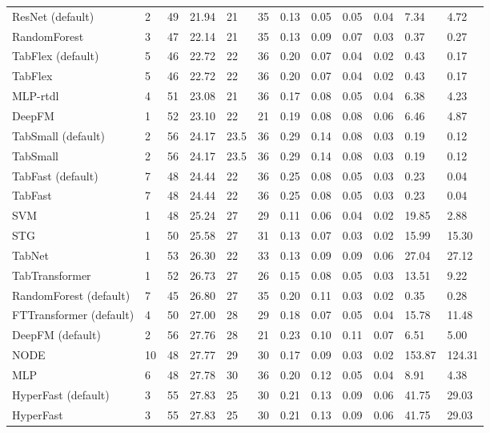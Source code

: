 \begin{tabular}{lllllrllllll}
ResNet (default) & 2 & 49 & 21.94 & 21 & 35 & 0.13 & 0.05 & 0.05 & 0.04 & 7.34 & 4.72 \\
RandomForest & 3 & 47 & 22.14 & 21 & 35 & 0.13 & 0.09 & 0.07 & 0.03 & 0.37 & 0.27 \\
TabFlex (default) & 5 & 46 & 22.72 & 22 & 36 & 0.20 & 0.07 & 0.04 & 0.02 & 0.43 & 0.17 \\
TabFlex & 5 & 46 & 22.72 & 22 & 36 & 0.20 & 0.07 & 0.04 & 0.02 & 0.43 & 0.17 \\
MLP-rtdl & 4 & 51 & 23.08 & 21 & 36 & 0.17 & 0.08 & 0.05 & 0.04 & 6.38 & 4.23 \\
DeepFM & 1 & 52 & 23.10 & 22 & 21 & 0.19 & 0.08 & 0.08 & 0.06 & 6.46 & 4.87 \\
TabSmall (default) & 2 & 56 & 24.17 & 23.5 & 36 & 0.29 & 0.14 & 0.08 & 0.03 & 0.19 & 0.12 \\
TabSmall & 2 & 56 & 24.17 & 23.5 & 36 & 0.29 & 0.14 & 0.08 & 0.03 & 0.19 & 0.12 \\
TabFast (default) & 7 & 48 & 24.44 & 22 & 36 & 0.25 & 0.08 & 0.05 & 0.03 & 0.23 & 0.04 \\
TabFast & 7 & 48 & 24.44 & 22 & 36 & 0.25 & 0.08 & 0.05 & 0.03 & 0.23 & 0.04 \\
SVM & 1 & 48 & 25.24 & 27 & 29 & 0.11 & 0.06 & 0.04 & 0.02 & 19.85 & 2.88 \\
STG & 1 & 50 & 25.58 & 27 & 31 & 0.13 & 0.07 & 0.03 & 0.02 & 15.99 & 15.30 \\
TabNet & 1 & 53 & 26.30 & 22 & 33 & 0.13 & 0.09 & 0.09 & 0.06 & 27.04 & 27.12 \\
TabTransformer & 1 & 52 & 26.73 & 27 & 26 & 0.15 & 0.08 & 0.05 & 0.03 & 13.51 & 9.22 \\
RandomForest (default) & 7 & 45 & 26.80 & 27 & 35 & 0.20 & 0.11 & 0.03 & 0.02 & 0.35 & 0.28 \\
FTTransformer (default) & 4 & 50 & 27.00 & 28 & 29 & 0.18 & 0.07 & 0.05 & 0.04 & 15.78 & 11.48 \\
DeepFM (default) & 2 & 56 & 27.76 & 28 & 21 & 0.23 & 0.10 & 0.11 & 0.07 & 6.51 & 5.00 \\
NODE & 10 & 48 & 27.77 & 29 & 30 & 0.17 & 0.09 & 0.03 & 0.02 & 153.87 & 124.31 \\
MLP & 6 & 48 & 27.78 & 30 & 36 & 0.20 & 0.12 & 0.05 & 0.04 & 8.91 & 4.38 \\
HyperFast (default) & 3 & 55 & 27.83 & 25 & 30 & 0.21 & 0.13 & 0.09 & 0.06 & 41.75 & 29.03 \\
HyperFast & 3 & 55 & 27.83 & 25 & 30 & 0.21 & 0.13 & 0.09 & 0.06 & 41.75 & 29.03 \\

\end{tabular}
